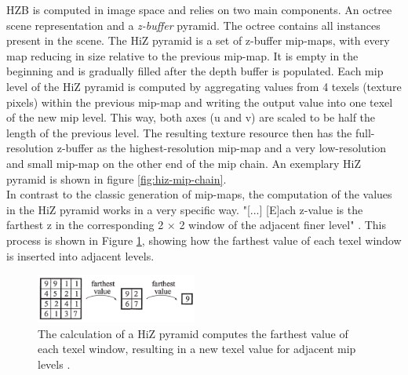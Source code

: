 \noindent
\ac{HZB} is computed in image space and relies on two main components. An octree scene representation and a 
\emph{z-buffer} pyramid. The octree contains all instances present in the scene. The \ac{HiZ} pyramid is a set of 
z-buffer mip-maps, with every map reducing in size relative to the previous mip-map. It is empty in the beginning 
and is gradually filled after the depth buffer is populated. Each mip level of the \ac{HiZ} pyramid is computed by 
aggregating values from 4 texels (texture pixels) within the previous mip-map and writing the output value into one 
texel of the new mip level. This way, both axes (u and v) are scaled to be half the length of the previous level. 
The resulting texture resource then has the full-resolution z-buffer as the highest-resolution mip-map and a very 
low-resolution and small mip-map on the other end of the mip chain. An exemplary \ac{HiZ} pyramid is shown in figure 
\ref{fig:hiz-mip-chain}.\\

\noindent
In contrast to the classic generation of mip-maps, the computation of the values in the \ac{HiZ} pyramid works in a 
very specific way. "[...] [E]ach z-value is the farthest z in the corresponding 2 \begin{math}\times\end{math} 2 window 
of the adjacent finer level" \cite{AkenineMoeller2018}. This process is shown in Figure \ref{fig:hiz-value-computation}, 
showing how the farthest value of each texel window is inserted into adjacent levels.\\

\begin{figure}[!]
    \centering
    \includegraphics[width=200px]{images/graphics/hiz-buf-values.jpg}
    \caption{The calculation of a \ac{HiZ} pyramid computes the farthest value of each texel window, 
    resulting in a new texel value for adjacent mip levels \cite{AkenineMoeller2018}.}
    \label{fig:hiz-value-computation}
\end{figure}

